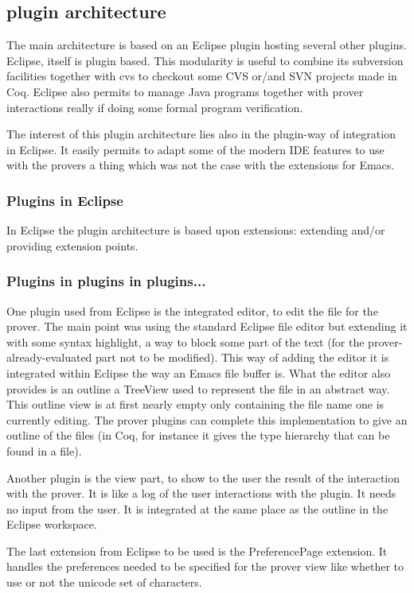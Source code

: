 \documentclass{entcs}
\begin{document}
\subsection{plugin architecture}
The main architecture is based on an Eclipse plugin hosting several other
plugins. Eclipse, itself is plugin based. This modularity is useful to 
combine its subversion facilities together with cvs to checkout some 
CVS or/and SVN projects made in Coq. Eclipse also permits to manage 
Java programs together with prover interactions really 
if doing some formal program verification.

The interest of this plugin architecture lies also in the plugin-way of 
integration in Eclipse. It easily permits to adapt some of the modern 
IDE features to use with the provers a thing which was not the case
with the extensions for Emacs.
\subsubsection{Plugins in Eclipse}
In Eclipse the plugin architecture is based upon extensions:
extending and/or providing extension points.
\subsubsection{Plugins in plugins in plugins...}
One plugin used from Eclipse is the integrated editor, to edit the 
file for the prover. The main point was using the standard Eclipse file editor
but extending it with some syntax highlight, a way to block some part
of the text (for the prover-already-evaluated part not to be modified). This
way of adding the editor it is integrated within Eclipse the way an Emacs 
file buffer is.  What the editor also provides is an outline a TreeView
used to represent the file in an abstract way. This outline view
is at first nearly empty only containing the file name one is currently
editing. The prover plugins can complete this implementation to give
an outline of the files (in Coq, for instance it gives the type
hierarchy that can be found in a file).

Another plugin is the view part, to show to the user the result of the
interaction with the prover. It is like a log of the user interactions
with the plugin. It needs no input from the user. It is integrated
at the same place as the outline in the Eclipse workspace.

The last extension from Eclipse to be used is the PreferencePage extension.
It handles the preferences needed to be specified for the prover view
like whether to use or not the unicode set of characters.
\end{document}
